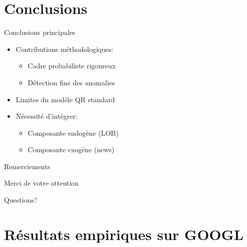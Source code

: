 \documentclass[aspectratio=169]{beamer}  %
\begin{document}
\section{Conclusions}

\begin{frame}{Conclusions principales}
    \begin{itemize}
        \item Contributions méthodologiques:
        \begin{itemize}
            \item Cadre probabiliste rigoureux
            \item Détection fine des anomalies
        \end{itemize}
        \item Limites du modèle QR standard
        \item Nécessité d'intégrer:
        \begin{itemize}
            \item Composante endogène (LOB)
            \item Composante exogène (news)
        \end{itemize}
    \end{itemize}
\end{frame}

\begin{frame}{Remerciements}
    \begin{center}
        \Large Merci de votre attention
        \vspace{1cm}
        
        \normalsize
        Questions?
    \end{center}
\end{frame}

\section{Résultats empiriques sur GOOGL}
\end{document}
